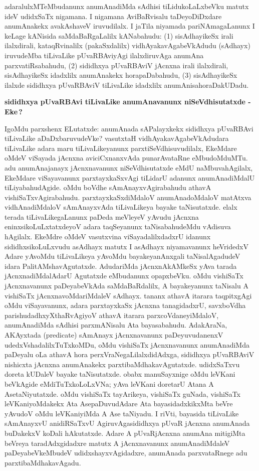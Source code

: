adaralulxMTeMbudanunx anumAnadiMda sAdhisi tiLidukoLaLxbeVku matutx ideV udidxSaTx nigamana. I nigamana AviBaRvisalu taDeyoDiDxdare anumAnakekx avakAshaveV iruvudilalx. I jaTila niyamada pariNAmagaLanunx I keLage kANisida saMdaBaRgaLalilx kANabahudu: (1) sisAdhayikeSx irali ilalxdirali, kataqRvinalilx (pakaSxdalilx) vidhAyakavAgabeVkAdudu (sAdhayx) iruvudeMba tiLivaLike pUvaRBAviyAgi ilalxdiruvAga anumAna parxvatiRsabahudu, (2) sididhxya pUvaRBAviV jAcnxna irali ilalxdirali, sisAdhayikeSx idadxlilx anumAnakekx horapaDabahudu, (3) sisAdhayikeSx ilalxde sididhxya pUvaRBAviV tiLivaLike idadxlilx anumAnisahoraDakUDadu.

\medskip
\begin{center}
{\Large\bf sididhxya pUvaRBAvi tiLivaLike anumAnavanunx niSeVdhisutatxde - Eke\,?}
\end{center}

IgoMdu parxshenx ELutatxde: anumAnada sAPalayxkekx sididhxya pUvaRBAvi tiLi\-vaLike aDaDxbaruvudeVke? vasutxtaH vidhAyakavAgabeVkAdudara tiLivaLike adara maru tiLi\-vaLikeyanunx parxtiSeVdhisuvudilalx, EkeMdare oMdeV viSayada jAcnxna aviciCxnanxvAda puna\-rA\-vataRne eMbudoMduMTu. adu anumAnajanayx jAcnxnavanunx niSeVdhisutatxde eMdU naMbuvahAgilalx, EkeMdare viSayavanunx parxtayxkaSxvAgi tiLidarU adanunx anumAna\break\-diMdalU tiLiyabahudAgide. oMdu boVdhe sAmAnayxvAgirabahudu athavA vishiSaTx\-vAgirabahudu. parxtayxkaSxdiMdaloV anumAnadoMdaloV matAtxva vidhAnadiMdaloV sAmAnayxvAda tiLivaLikeya bayake taNisutatxde. elalx terada tiLivaLikegaLanunx paDeda meVleyeV yAvudu jAcnxna eninxsikoLuLxtatxdeyoV adara taqSeyanunx taNisabahudeMdu vAdisuva hAgilalx. EkeMdre oMdeV vasutxvina viSayadalilxdadxrU idanunx sididhxsi\-koLuLx\-vudu asAdhayx matutx I asAdhayx niyamavanunx heVridedxV Adare yAvoMdu tiLi\-vaLikeya yAvoMdu bayakeyanAnxgali taNisalAgadudeV idara PalitAMshavAgutatxde. Aduda\-riMda jAcnxnAkAMkeSx yAva tarada jAcnxnadiMdalAdarU Agutatxde eMbudanunx opapxbeVku. oMdu vishiSaTx jAcnxnavanunx paDeyabeVkAda saMdaBaRdalilx, A bayakeyanunx taNisalu A vishiSaTx jAcnxnavoMdariMdaleV sAdhayx. tananx athavA itarara taqpitxgAgi oMdu viSaya\-vanunx, adara parxtayxkaSx jAcnxna tanagidadxrU, savxboVdha parishudadhxyXthaRvAgiyoV athavA itarara parxcoVdaneyiMdaloV, anumAnadiMda sAdhisi parxmANisalu Ata bayasabahudu. AdakAraNa, AKAyxtada {\rm(predicate)} sAmAnayx jAcnxnavanunx paDeyuvudanenxV udedxVsha\-dalilxTuTxkoMDu, oMdu vishiSaTx jAcnxnavanunx anumAnadiMda paDeyalu oLa athavA hora perxVraNegaLilalxdidAdxga, sididhxya pUvaRBAviV nishicxta jAcnxna anumAnakekx parxtibaMdhaka\-vAgutatxde. udidxSaTxvu doreta kUDaleV bayake taNisutatxde. obabx manuSayxnige oMdu leVKani beVkAgide eMdiTuTxkoLoLxVNa; yAva leVKani doretarU Atana A Ase\break taNiyu\-tatxde. oMdu vishiSaTx tayArikeya, vishiSaTx guNada, vishiSaTx leVKaniyoMdakekx Ata AsepaDuvudAdare Ata bayasidadxkikxMta beVre yAvudoV oMdu leVKani\-yiMda A Ase taNiyadu. I riVti, bayasida tiLivaLike sAmAnayxvU anidiRSaTxvU AgiruvAga\break sididhxya pUvaR jAcnxna anumAnada buDakekxV koDali hAkutatxde. Adare A pUvaR\-jAcnxna anumAna mitigiMta beVreya taradAdxgidadxre matutx A jAcnxnavanunx anumAnadiMdaleV paDeyabeVkeMbudeV udidxshayxvAgidadxre, anumAnada parxvataRnege adu parxtibaMdhaka\break\-vAgadu.

